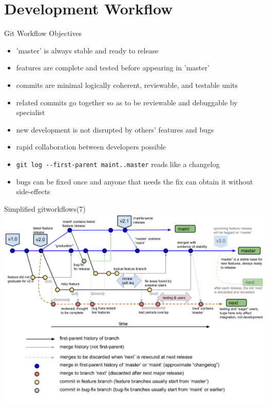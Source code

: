 \documentclass{beamer}
\begin{document}
\section{Development Workflow}
\begin{frame}{Git Workflow Objectives}
  \begin{itemize}
  \item 'master' is always stable and ready to release
  \item features are complete and tested before appearing in 'master'
  \item commits are minimal logically coherent, reviewable, and testable units
  \item related commits go together so as to be reviewable and debuggable by specialist
  \item new development is not disrupted by others' features and bugs
  \item rapid collaboration between developers possible
  \item \texttt{git log -{}-first-parent maint..master} reads like a changelog
  \item bugs can be fixed once and anyone that needs the fix can obtain it without side-effects
  \end{itemize}
\end{frame}

\begin{frame}{Simplified gitworkflows(7)}
  \includegraphics[width=\textwidth]{figures/Git/simplified-gitworkflows7.pdf}
\end{frame}
\end{document}
